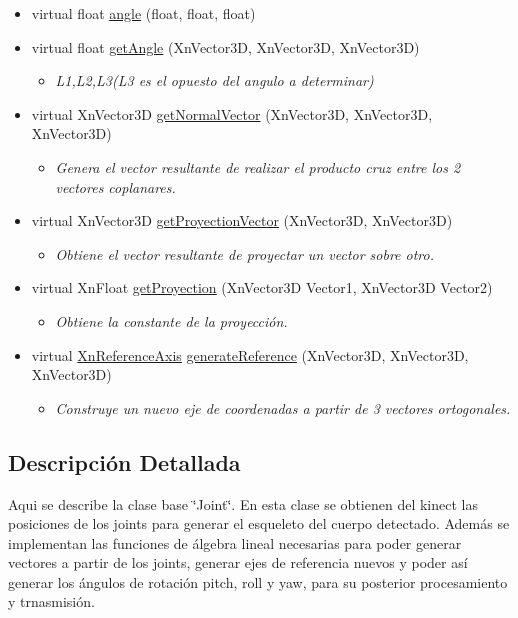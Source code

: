 \begin{itemize}
\begin{itemize}
\end{itemize}
\item virtual float \hyperlink{class_joint_ab4a853045a69e77e8b67d195be145eed}{angle} (float, float, float)
\item 
virtual float \hyperlink{class_joint_a52f2f6003f4cff059847d959488622a1}{get\-Angle} (\-Xn\-Vector3\-D, \-Xn\-Vector3\-D, \-Xn\-Vector3\-D)
\begin{itemize}\small\item\em \-L1,\-L2,\-L3(\-L3 es el opuesto del angulo a determinar) \end{itemize}\item 
virtual \-Xn\-Vector3\-D \hyperlink{class_joint_ac59f570adbaf039bbe0f4173e5e7e2ce}{get\-Normal\-Vector} (\-Xn\-Vector3\-D, \-Xn\-Vector3\-D, \-Xn\-Vector3\-D)
\begin{itemize}\small\item\em \-Genera el vector resultante de realizar el producto cruz entre los 2 vectores coplanares. \end{itemize}\item 
virtual \-Xn\-Vector3\-D \hyperlink{class_joint_af5590ba3d5bfc4e27a43036a1d394629}{get\-Proyection\-Vector} (\-Xn\-Vector3\-D, \-Xn\-Vector3\-D)
\begin{itemize}\small\item\em \-Obtiene el vector resultante de proyectar un vector sobre otro. \end{itemize}\item 
virtual \-Xn\-Float \hyperlink{class_joint_a06ed69732a17f61fa6ce9fa5ba2541ea}{get\-Proyection} (\-Xn\-Vector3\-D \-Vector1, \-Xn\-Vector3\-D \-Vector2)
\begin{itemize}\small\item\em \-Obtiene la constante de la proyección. \end{itemize}\item 
virtual \hyperlink{struct_xn_reference_axis}{\-Xn\-Reference\-Axis} \hyperlink{class_joint_a603eab4701f005bc6a39911897eb6c7d}{generate\-Reference} (\-Xn\-Vector3\-D, \-Xn\-Vector3\-D, \-Xn\-Vector3\-D)
\begin{itemize}\small\item\em \-Construye un nuevo eje de coordenadas a partir de 3 vectores ortogonales. \end{itemize}\end{itemize}


\subsection{\-Descripción \-Detallada}
\-Aqui se describe la clase base \char`\"{}\-Joint\char`\"{}. En esta clase  se obtienen del kinect las posiciones de los joints para generar el esqueleto del cuerpo detectado. Además se implementan las funciones de álgebra lineal necesarias para poder generar vectores a partir de los joints, generar ejes de referencia nuevos y poder así generar los ángulos de rotación pitch, roll y yaw, para su  posterior procesamiento y trnasmisión. 

